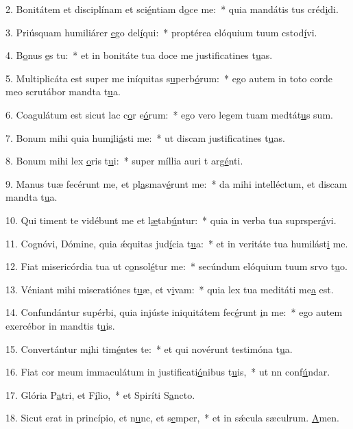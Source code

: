2. Bonitátem et disciplínam et sci\uline{é}ntiam d\uline{o}ce me:~* quia mandátis tus créd\uline{i}di.\par 
3. Priúsquam humiliárer \uline{e}go del\uline{í}qui:~* proptérea elóquium tuum cstod\uline{í}vi.\par 
4. B\uline{o}nus \uline{e}s tu:~* et in bonitáte tua doce me justificatines t\uline{u}as.\par 
5. Multiplicáta est super me iníquitas s\uline{u}perb\uline{ó}rum:~* ego autem in toto corde meo scrutábor mandta t\uline{u}a.\par 
6. Coagulátum est sicut lac c\uline{o}r e\uline{ó}rum:~* ego vero legem tuam medtát\uline{u}s sum.\par 
7. Bonum mihi quia hum\uline{i}li\uline{á}sti me:~* ut discam justificatines t\uline{u}as.\par 
8. Bonum mihi lex \uline{o}ris t\uline{u}i:~* super míllia auri t arg\uline{é}nti.\par 
9. Manus tuæ fecérunt me, et pl\uline{a}smav\uline{é}runt me:~* da mihi intelléctum, et discam mandta t\uline{u}a.\par 
10. Qui timent te vidébunt me et l\uline{æ}tab\uline{ú}ntur:~* quia in verba tua suprsper\uline{á}vi.\par 
11. Cognóvi, Dómine, quia ǽquitas jud\uline{í}cia t\uline{u}a:~* et in veritáte tua humilást\uline{i} me.\par 
12. Fiat misericórdia tua ut c\uline{o}nsol\uline{é}tur me:~* secúndum elóquium tuum srvo t\uline{u}o.\par 
13. Véniant mihi miseratiónes t\uline{u}æ, et v\uline{i}vam:~* quia lex tua meditáti me\uline{a} est.\par 
14. Confundántur supérbi, quia injúste iniquitátem fec\uline{é}runt \uline{i}n me:~* ego autem exercébor in mandtis t\uline{u}is.\par 
15. Convertántur m\uline{i}hi tim\uline{é}ntes te:~* et qui novérunt testimóna t\uline{u}a.\par 
16. Fiat cor meum immaculátum in justificati\uline{ó}nibus t\uline{u}is,~* ut nn conf\uline{ú}ndar.\par 
17. Glória P\uline{a}tri, et F\uline{í}lio,~* et Spiríti S\uline{a}ncto.\par 
18. Sicut erat in princípio, et n\uline{u}nc, et s\uline{e}mper,~* et in sǽcula sæculrum. \uline{A}men.\par 

